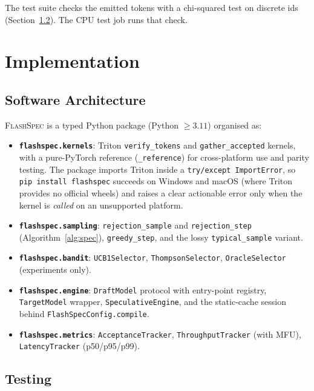 \documentclass[11pt]{article}
\newcommand{\flashspec}{\textsc{FlashSpec}}
\begin{document}
The test suite checks the emitted tokens with a chi-squared test on
discrete ids (Section~\ref{sec:testing}).
The CPU test job runs that check.

\section{Implementation}
\label{sec:implementation}

\subsection{Software Architecture}

\flashspec{} is a typed Python package (Python $\geq 3.11$) organised as:

\begin{itemize}
  \item \textbf{\texttt{flashspec.kernels}}:
        Triton \texttt{verify\_tokens} and \texttt{gather\_accepted} kernels,
        with a pure-PyTorch reference (\texttt{\_reference}) for
        cross-platform use and parity testing.
        The package imports Triton inside a \texttt{try/except ImportError},
        so \texttt{pip install flashspec} succeeds on Windows and macOS
        (where Triton provides no official wheels)
        and raises a clear actionable error only when the kernel is
        \emph{called} on an unsupported platform.
  \item \textbf{\texttt{flashspec.sampling}}:
        \texttt{rejection\_sample} and \texttt{rejection\_step}
        (Algorithm~\ref{alg:spec}), \texttt{greedy\_step}, and the lossy
        \texttt{typical\_sample} variant.
  \item \textbf{\texttt{flashspec.bandit}}:
        \texttt{UCB1Selector}, \texttt{ThompsonSelector},
        \texttt{OracleSelector} (experiments only).
  \item \textbf{\texttt{flashspec.engine}}:
        \texttt{DraftModel} protocol with entry-point registry,
        \texttt{TargetModel} wrapper, \texttt{SpeculativeEngine}, and the
        static-cache session behind \texttt{FlashSpecConfig.compile}.
  \item \textbf{\texttt{flashspec.metrics}}:
        \texttt{AcceptanceTracker}, \texttt{ThroughputTracker}
        (with MFU), \texttt{LatencyTracker} (p50/p95/p99).
\end{itemize}

\subsection{Testing}
\label{sec:testing}
\end{document}
